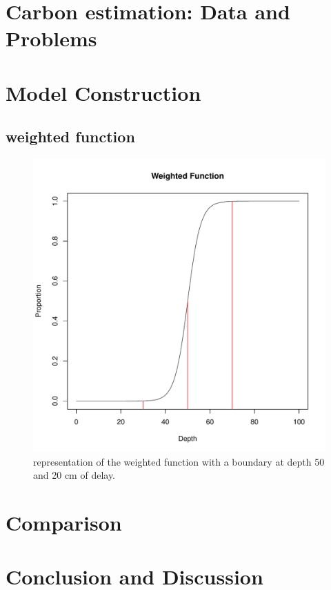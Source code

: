 \documentclass [10pt] {article}
\begin{document}
\section{Carbon estimation: Data and Problems}

\section{Model Construction}


\subsection{weighted function}

\begin{figure}
	\begin{centering}
		\includegraphics{weighted_fun.pdf}
		\caption{representation of the weighted function with a boundary at depth 50 and 20 cm of delay.}
		\label{}
	\end{centering}
\end{figure}





\section{Comparison}







\section{Conclusion and Discussion}














\newpage
\end{document}
